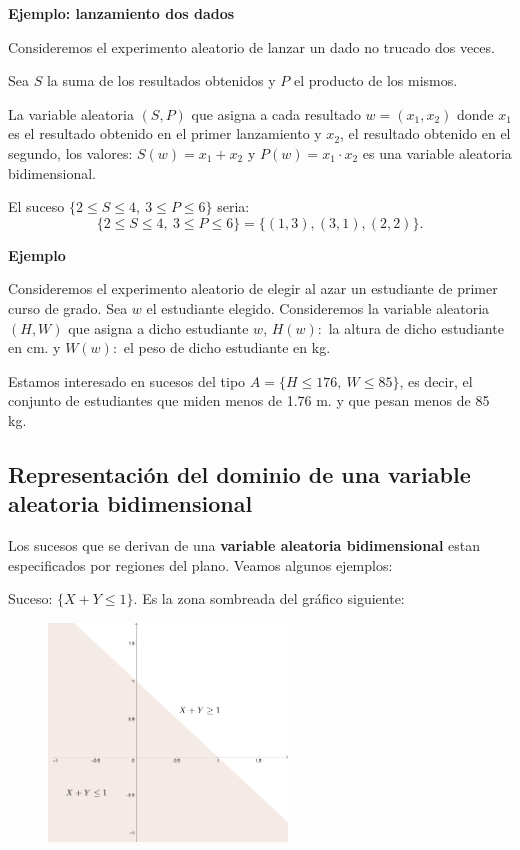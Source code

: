 \documentclass[]{book}
\begin{document}
\textbf{Ejemplo: lanzamiento dos dados}

Consideremos el experimento aleatorio de lanzar un dado no trucado dos veces.

Sea \(S\) la suma de los resultados obtenidos y \(P\) el producto de los mismos.

La variable aleatoria \((S,P)\) que asigna a cada resultado \(w=(x_1,x_2)\) donde \(x_1\) es el resultado obtenido en el primer lanzamiento y \(x_2\), el resultado obtenido en el segundo, los valores: \(S(w)=x_1+x_2\) y \(P(w)=x_1\cdot x_2\) es una variable aleatoria bidimensional.

El suceso \(\{2\leq S\leq 4,\ 3\leq P\leq 6\}\) seria:
\[
\{2\leq S\leq 4,\ 3\leq P\leq 6\} = \{(1,3),(3,1),(2,2)\}.
\]

\textbf{Ejemplo}

Consideremos el experimento aleatorio de elegir al azar un estudiante de primer curso de grado. Sea \(w\) el estudiante elegido. Consideremos la variable aleatoria \((H,W)\) que asigna a dicho estudiante \(w\), \(H(w):\) la altura de dicho estudiante en cm. y \(W(w):\) el peso de dicho estudiante en kg.

Estamos interesado en sucesos del tipo \(A=\{H\leq 176,\ W\leq 85\}\), es decir, el conjunto de estudiantes que miden menos de 1.76 m. y que pesan menos de 85 kg.

\hypertarget{representaciuxf3n-del-dominio-de-una-variable-aleatoria-bidimensional}{%
\subsection{Representación del dominio de una variable aleatoria bidimensional}\label{representaciuxf3n-del-dominio-de-una-variable-aleatoria-bidimensional}}

Los sucesos que se derivan de una \textbf{variable aleatoria bidimensional} estan especificados por regiones del plano.
Veamos algunos ejemplos:

Suceso: \(\{X+Y\leq 1\}\). Es la zona sombreada del gráfico siguiente:

\begin{figure}
\includegraphics[width=2.5in]{Images/Bidim1} \end{figure}
\end{document}

